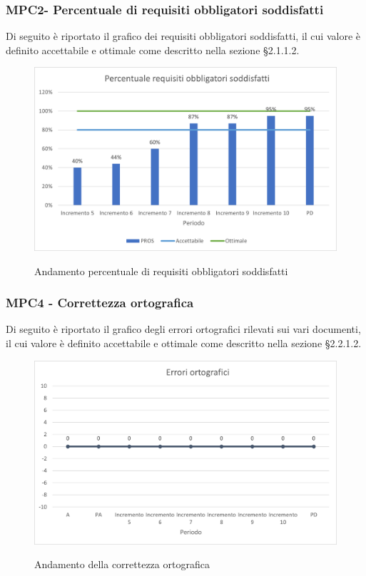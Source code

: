 \subsubsection{MPC2- Percentuale di requisiti obbligatori soddisfatti}
Di seguito è riportato il grafico dei requisiti obbligatori soddisfatti, il cui valore è definito accettabile e ottimale come descritto nella sezione §2.1.1.2.\\

\begin{figure}[H]
\centering
\includegraphics[scale=0.78]{res/ResocontoAttivitaDiVerifica/res/metriche/grafici/img/PROS.png}\\
\caption{Andamento percentuale di requisiti obbligatori soddisfatti}
\end{figure}



\subsubsection{MPC4 - Correttezza ortografica}
Di seguito è riportato il grafico degli errori ortografici rilevati sui vari documenti, il cui valore è definito accettabile e ottimale come descritto nella sezione §2.2.1.2.\\

\begin{figure}[H]
\centering
\includegraphics[scale=0.78]{res/ResocontoAttivitaDiVerifica/res/metriche/grafici/img/correttezzaOrtografica.png}\\
\caption{Andamento della correttezza ortografica}
\end{figure}

